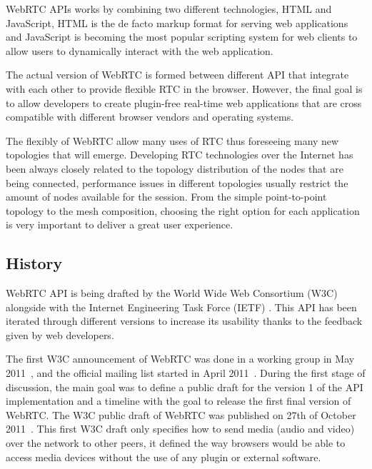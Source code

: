 WebRTC APIs works by combining two different technologies, HTML and JavaScript, HTML is the de facto markup format for serving web applications and JavaScript is becoming the most popular scripting system for web clients to allow users to dynamically interact with the web application. 

The actual version of WebRTC is formed between different API that integrate with each other to provide flexible RTC in the browser. However, the final goal is to allow developers to create plugin-free real-time web applications that are cross compatible with different browser vendors and operating systems.

The flexibly of WebRTC allow many uses of RTC thus foreseeing many new topologies that will emerge. Developing RTC technologies over the Internet has been always closely related to the topology distribution of the nodes that are being connected, performance issues in different topologies usually restrict the amount of nodes available for the session. From the simple point-to-point topology to the mesh composition, choosing the right option for each application is very important to deliver a great user experience.

\subsection{History}

WebRTC API is being drafted by the World Wide Web Consortium (W3C)  alongside with the Internet Engineering Task Force (IETF) . This API has been iterated through different versions to increase its usability thanks to the feedback given by web developers.

The first W3C announcement of WebRTC was done in a working group in May 2011~\cite{webrtcW3cgroup}, and the official mailing list started in April 2011~\cite{welcomeW3C}. During the first stage of discussion, the main goal was to define a public draft for the version 1 of the API implementation and a timeline with the goal to release the first final version of WebRTC. The W3C public draft of WebRTC was published on 27th of October 2011~\cite{originalW3Cdraft}. This first W3C draft only specifies how to send media (audio and video) over the network to other peers, it defined the way browsers would be able to access media devices without the use of any plugin or external software.


